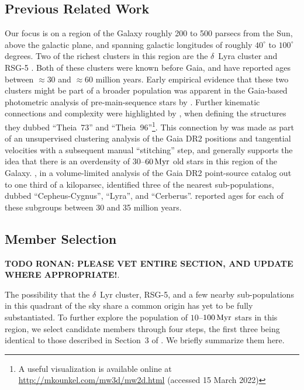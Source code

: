 \documentclass[12pt,twocolumn,linenumbers]{aastex63}
\begin{document}
\subsection{Previous Related Work}

Our focus is on a region of the Galaxy roughly 200 to 500 parsecs from
the Sun, above the galactic plane, and spanning galactic longitudes of
roughly $40^\circ$ to $100^\circ$ degrees.  Two of the richest
clusters in this region are the $\delta$~Lyra cluster
\citep{stephenson_possible_1959} and RSG-5 \citep{roser_nine_2016}.
Both of these clusters were known before Gaia, and have reported ages
between $\approx$30 and $\approx$60 million years.  Early
empirical evidence that these two clusters might be part of a broader
population was apparent in the Gaia-based photometric analysis of
pre-main-sequence stars by \citet[][see their Figures~11 and~13]{Zari2018}.
Further kinematic connections and complexity were highlighted by
\citet{KounkelCovey2019}, when defining the structures they dubbed
``Theia~73'' and ``Theia~96''\footnote{A useful visualization is
available online at \url{http://mkounkel.com/mw3d/mw2d.html} (accessed
15 March 2022)}.  This connection by \citet{KounkelCovey2019} was made
as part of an unsupervised clustering analysis of the Gaia DR2
positions and tangential velocities with a subsequent manual
``stitching'' step, and generally supports the idea that there is an
overdensity of $30$--$60\,{\rm Myr}$ old stars in this region of the
Galaxy.  \citet{Kerr2021}, in a volume-limited analysis of the Gaia
DR2 point-source catalog out to one third of a kiloparsec, identified
three of the nearest sub-populations, dubbed ``Cepheus-Cygnus'',
``Lyra'', and ``Cerberus''.  \citet{Kerr2021} reported ages for each
of these subgroups between 30 and 35 million years.


\subsection{Member Selection}
\label{subsec:members}

{\bf TODO RONAN: PLEASE VET ENTIRE SECTION, AND UPDATE WHERE
APPROPRIATE!}.

The possibility that the $\delta$~Lyr cluster, RSG-5, and a few nearby
sub-populations in this quadrant of the sky share a common origin has
yet to be fully substantiated.  To further explore the population of
$10$--$100\,{\rm Myr}$ stars in this region, we select candidate
members through four steps, the first three being identical to those
described in Section~3 of \citet{Kerr2021}.  We briefly summarize them
here.
\end{document}
